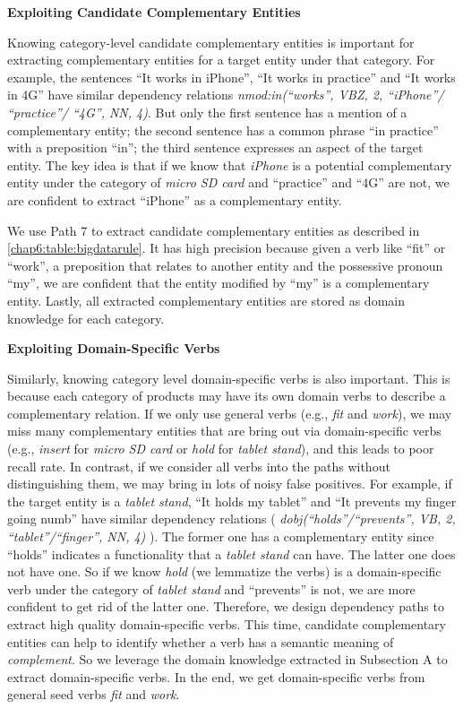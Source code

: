 \textbf{Exploiting Candidate Complementary Entities}

Knowing category-level candidate complementary entities is important for extracting complementary entities for a target entity under that category. For example, the sentences ``It works in iPhone'', ``It works in practice'' and ``It works in 4G'' have similar dependency relations \textit{nmod:in(``works'', VBZ, 2, ``iPhone''/ ``practice''/ ``4G'', NN, 4)}. But only the first sentence has a mention of a complementary entity; the second sentence has a common phrase ``in practice'' with a preposition ``in''; the third sentence expresses an aspect of the target entity. The key idea is that if we know that \textit{iPhone} is a potential complementary entity under the category of \textit{micro SD card} and ``practice'' and ``4G'' are not, we are confident to extract ``iPhone'' as a complementary entity.

We use Path 7 to extract candidate complementary entities as described in \ref{chap6:table:bigdatarule}. It has high precision because given a verb like ``fit'' or ``work'', a preposition that relates to another entity and the possessive pronoun ``my'', we are confident that the entity modified by ``my'' is a complementary entity. Lastly, all extracted complementary entities are stored as domain knowledge for each category. 

\textbf{Exploiting Domain-Specific Verbs}

Similarly, knowing category level domain-specific verbs is also important. This is because each category of products may have its own domain verbs to describe a complementary relation. If we only use general verbs (e.g., \textit{fit} and \textit{work}), we may miss many complementary entities that are bring out via domain-specific verbs (e.g., \textit{insert} for \textit{micro SD card} or \textit{hold} for \textit{tablet stand}), and this leads to poor recall rate. In contrast, if we consider all verbs into the paths without distinguishing them, we may bring in lots of noisy false positives. For example, if the target entity is a \textit{tablet stand}, ``It holds my tablet'' and ``It prevents my finger going numb'' have similar dependency relations ( \textit{dobj(``holds''/``prevents'', VB, 2, ``tablet''/``finger'', NN, 4)} ). The former one has a complementary entity since ``holds'' indicates a functionality that a \textit{tablet stand} can have. The latter one does not have one. So if we know \textit{hold} (we lemmatize the verbs) is a domain-specific verb under the category of \textit{tablet stand} and ``prevents'' is not, we are more confident to get rid of the latter one. Therefore, we design dependency paths to extract high quality domain-specific verbs. This time, candidate complementary entities can help to identify whether a verb has a semantic meaning of \textit{complement}. So we leverage the domain knowledge extracted in Subsection A to extract domain-specific verbs. In the end, we get domain-specific verbs from general seed verbs \textit{fit} and \textit{work}.

